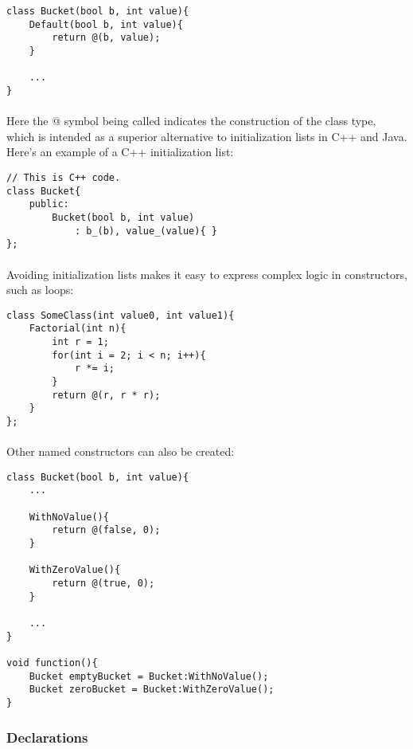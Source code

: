 \documentclass[12pt,twoside,notitlepage]{report}
\begin{document}
\small{
\begin{verbatim}
class Bucket(bool b, int value){
    Default(bool b, int value){
        return @(b, value);
    }

    ...
}
\end{verbatim}
}

\paragraph{}
Here the @ symbol being called indicates the construction of the class type, which is intended as a superior alternative to initialization lists in C++ and Java. Here's an example of a C++ initialization list:

\small{
\begin{verbatim}
// This is C++ code.
class Bucket{
    public:
        Bucket(bool b, int value)
            : b_(b), value_(value){ }
};
\end{verbatim}
}

\paragraph{}
Avoiding initialization lists makes it easy to express complex logic in constructors, such as loops:

\small{
\begin{verbatim}
class SomeClass(int value0, int value1){
    Factorial(int n){
        int r = 1;
        for(int i = 2; i < n; i++){
            r *= i;
        }
        return @(r, r * r);
    }
};
\end{verbatim}
}

\paragraph{}
Other named constructors can also be created:

\small{
\begin{verbatim}
class Bucket(bool b, int value){
    ...
    
    WithNoValue(){
        return @(false, 0);
    }
    
    WithZeroValue(){
        return @(true, 0);
    }

    ...
}

void function(){
    Bucket emptyBucket = Bucket:WithNoValue();
    Bucket zeroBucket = Bucket:WithZeroValue();
}
\end{verbatim}
}

\subsubsection{Declarations}
\end{document}

